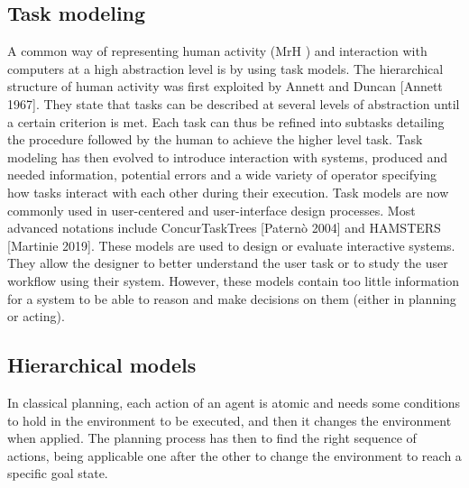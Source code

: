 \subsection{Task modeling}

A common way of representing human activity (MrH ) and interaction with computers at a high abstraction level is by using task models. The hierarchical structure of human activity was first exploited by Annett and Duncan [Annett 1967]. They state that tasks can be described at several levels of abstraction until a certain criterion is met. Each task can thus be refined into subtasks detailing the procedure followed by the human to achieve the higher level task. Task modeling has then evolved to introduce interaction with systems, produced and needed information, potential errors and a wide variety of operator specifying how tasks interact with each other during their execution. Task models are now commonly used in user-centered and user-interface design processes. Most advanced notations include ConcurTaskTrees [Paternò 2004] and HAMSTERS [Martinie 2019]. These models are used to design or evaluate interactive systems. They allow the designer to better understand the user task or to study the user workflow using their system. However, these models contain too little information for a system to be able to reason and make decisions on them (either in planning or acting).


\subsection{Hierarchical models}

In classical planning, each action of an agent is atomic and needs some conditions to hold in the environment to be executed, and then it changes the environment when applied. The planning process has then to find the right sequence of actions, being applicable one after the other to change the environment to reach a specific goal state. 

